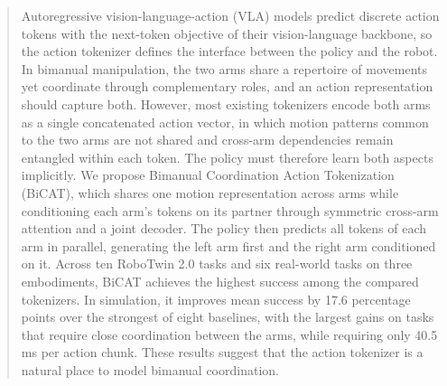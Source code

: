 \begin{abstract}


Autoregressive vision-language-action (VLA) models predict discrete action tokens with the next-token objective of their vision-language backbone, so the action tokenizer defines the interface between the policy and the robot. In bimanual manipulation, the two arms share a repertoire of movements yet coordinate through complementary roles, and an action representation should capture both. However, most existing tokenizers encode both arms as a single concatenated action vector, in which motion patterns common to the two arms are not shared and cross-arm dependencies remain entangled within each token. The policy must therefore learn both aspects implicitly. We propose Bimanual Coordination Action Tokenization (BiCAT), which shares one motion representation across arms while conditioning each arm’s tokens on its partner through symmetric cross-arm attention and a joint decoder. The policy then predicts all tokens of each arm in parallel, generating the left arm first and the right arm conditioned on it. Across ten RoboTwin 2.0 tasks and six real-world tasks on three embodiments, BiCAT achieves the highest success among the compared tokenizers. In simulation, it improves mean success by 17.6 percentage points over the strongest of eight baselines, with the largest gains on tasks that require close coordination between the arms, while requiring only 40.5 ms per action chunk. These results suggest that the action tokenizer is a natural place to model bimanual coordination.
\end{abstract}
